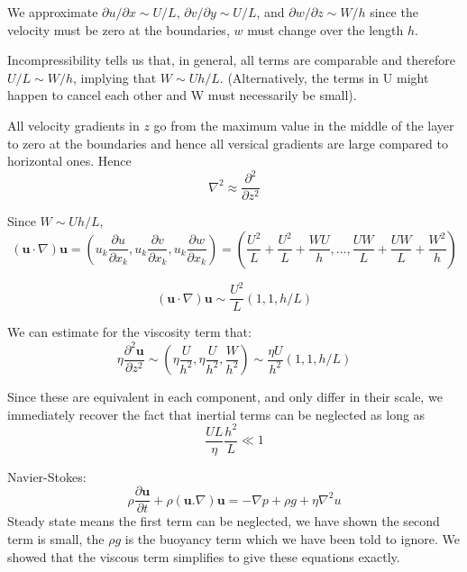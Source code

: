 \documentclass[10pt]{report}
\begin{document}
\begin{answer5}
		We approximate $\partial u / \partial x \sim U/L$, $\partial v / \partial y \sim U/L$,
		and $\partial w / \partial z \sim W/h$ since the velocity must be zero at the boundaries,
		$w$ must change over the length $h$.

		Incompressibility tells us that, in general, all terms are comparable and therefore
		$U/L \sim W/h$, implying that $W \sim Uh/L$. (Alternatively, the terms in U might happen to cancel
		each other and W must necessarily be small).

		All velocity gradients in $z$ go from the maximum value in the middle of the layer to zero at the
		boundaries and hence all versical gradients are large compared to horizontal ones.
		Hence
		\begin{equation*}
			\nabla^2 \approx \frac{\partial^2}{\partial z^2}
		\end{equation*}

		Since $W\sim Uh/L$,
		\begin{equation*}
			(\mathbf{u}\cdot\nabla) \mathbf{u} =
			\left( u_k \frac{\partial u}{\partial x_k},
				   u_k \frac{\partial v}{\partial x_k},
                    u_k \frac{\partial w}{\partial x_k} \right) =
                    \left( \frac{U^2}{L}+\frac{U^2}{L}+ \frac{W U}{h},
					\ldots ,
                     \frac{UW}{L}+\frac{UW}{L}+ \frac{W^2}{h}
                     \right)
		\end{equation*}

		\begin{equation*}
			(\mathbf{u}\cdot\nabla) \mathbf{u} \sim
                    \frac{U^2}{L} \left( 1, 1, h/L \right)
		\end{equation*}

		We can estimate for the viscosity term that:
		\begin{equation*}
			\eta \frac{\partial^2 \mathbf{u}}{\partial z^2}
			\sim \left( \eta \frac{U}{h^2}, \eta \frac{U}{h^2}, \frac{W}{h^2} \right)
			\sim \frac{\eta U}{h^2} \left( 1, 1, h/L \right)
		\end{equation*}

		Since these are equivalent in each component, and only differ in their scale,
		we immediately recover the fact that inertial terms can be neglected as long as
		\begin{equation*}
			\frac{UL}{\eta}\frac{h^2}{L} \ll 1
		\end{equation*}

		Navier-Stokes:
		\begin{equation*}
			\rho\frac{\partial \mathbf{u}}{\partial t} + \rho (\mathbf{u}.\nabla)\mathbf{u} = -\nabla p + \rho g + \eta \nabla^2 u
		\end{equation*}
		Steady state means the first term can be neglected, we have shown the second term is small,
		the $\rho g$ is the buoyancy term which we have been told to ignore. We showed that the
		viscous term simplifies to give these equations exactly.


\end{answer5}
\end{document}
